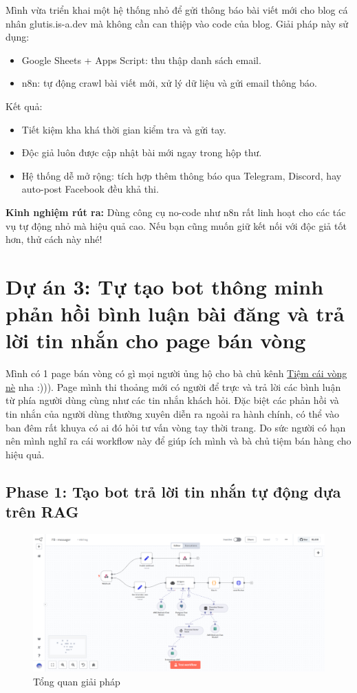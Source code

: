 Mình vừa triển khai một hệ thống nhỏ để gửi thông báo bài viết mới cho blog cá nhân glutis.is-a.dev mà không cần can thiệp vào code của blog. Giải pháp này sử dụng:

\begin{itemize}
    \item Google Sheets + Apps Script: thu thập danh sách email.

    \item n8n: tự động crawl bài viết mới, xử lý dữ liệu và gửi email thông báo.
\end{itemize}

Kết quả:
\begin{itemize}
    \item Tiết kiệm kha khá thời gian kiểm tra và gửi tay.
    \item Độc giả luôn được cập nhật bài mới ngay trong hộp thư.
    \item  Hệ thống dễ mở rộng: tích hợp thêm thông báo qua Telegram, Discord, hay auto-post Facebook đều khả thi.
\end{itemize}

\textbf{Kinh nghiệm rút ra:}
Dùng công cụ no-code như n8n rất linh hoạt cho các tác vụ tự động nhỏ mà hiệu quả cao. Nếu bạn cũng muốn giữ kết nối với độc giả tốt hơn, thử cách này nhé!

\newpage 


\section{\textbf{Dự án 3: Tự tạo bot thông minh phản hồi bình luận bài đăng và trả lời tin nhắn cho page bán vòng}}

Mình có 1 page bán vòng có gì mọi người ủng hộ cho bà chủ kênh 
\href{fb.com}{Tiệm cái vòng nè} nha :))). Page mình thi thoảng mới có người để trực và trả lời các bình luận từ phía người dùng cùng như các tin nhắn khách hỏi. Đặc biệt các phản hồi và tin nhắn của người dùng thường xuyên diễn ra ngoài ra hành chính, có thể vào ban đêm rất khuya có ai đó hỏi tư vấn vòng tay thời trang. Do sức người có hạn nên mình nghĩ ra cái workflow này để giúp ích mình và bà chủ tiệm bán hàng cho hiệu quả.

\subsection{Phase 1: Tạo bot trả lời tin nhắn tự động dựa trên RAG}
\begin{figure}[htbp]
    \centering
    \includegraphics[width=1\linewidth]{Chap1-7/fb_mess.pdf}
    \caption{Tổng quan giải pháp}
\end{figure}

